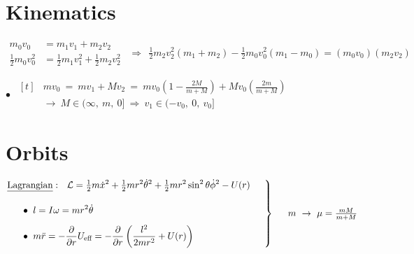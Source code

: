 \documentclass[12pt]{article}
\begin{document}
%
%
\newpage

\section{Kinematics}
\(
    \begin{aligned}
        m_0 v_0 &= m_1 v_1 + m_2 v_2\\[5pt]
        \tfrac{1}{2} m_0 v_0^2 &= \tfrac{1}{2} m_1 v_1^2 + \tfrac{1}{2} m_2 v_2^2
    \end{aligned}
    \ \ \Rightarrow\ \ 
    \boxed{ 
        \tfrac{1}{2} m_2 v_2^2 (m_1 + m_2) - \tfrac{1}{2} m_0 v_0^2 (m_1 - m_0) 
        = (m_0 v_0)(m_2 v_2) 
    }
\)

\vspace{15pt}\noindent
\(
    \bullet\ \ \begin{aligned}[t]
        &\boxed{ 
            m v_0 \ =\ m v_1 + M v_2 
            \ =\ m v_0 \left( 1 - \tfrac{2M}{m+M} \right) + M v_0 \left( \tfrac{2m}{m + M} \right) 
        }
            \\[5pt]
        &\rightarrow\ \boxed{
            M \in (\infty,\ m,\ 0] 
            \ \Rightarrow\ v_1 \in (-v_0,\ 0,\ v_0]
        }
    \end{aligned}
\)

\vspace{10pt}
\section{Orbits}

\(\left.\begin{aligned}
    &\text{\underline{Lagrangian}}:\ \ \mathcal{L} = \tfrac{1}{2} m\dot{x}^2 
        + \tfrac{1}{2} m r^2 \dot{\theta}^2 
        + \tfrac{1}{2} m r^2\sin^2{\theta} \dot{\phi}^2 - U(r) \\[10pt]
    &\indent\bullet\ l = I \omega = m r^2 \dot{\theta}\\[5pt]
    &\indent\bullet\ m\ddot{r} = - \frac{\partial}{\partial r} U_\text{eff} 
        = - \frac{\partial}{\partial r} \left( \frac{l^2}{2m r^2} + U(r) \right)
\end{aligned}\indent \right\} \indent m\ \rightarrow\ \mu = \frac{mM}{m+M}\)
\end{document}
